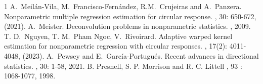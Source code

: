 \documentclass[11pt,a4paper,openany]{article}
\begin{document}
\begin{thebibliography}{1}
A.~Meil\'an-Vila, M.~Francisco-Fern\'andez, R.M.~Crujeiras and A.~Panzera.
\newblock Nonparametric multiple regression estimation for circular response.
, 30: 650-672, (2021).
A.~Meister.
\newblock Deconvolution problems in nonparametric statistics.
, 2009. 
T. D.~Nguyen, T. M.~Pham Ngoc, V.~Rivoirard.
\newblock Adaptive warped kernel estimation for nonparametric regression with circular responses.
, 17(2): 4011-4048, (2023).
A.~Pewsey and E.~Garc\'ia-Portugu\'es.
\newblock Recent advances in directional statistics.
, 30: 1-58, 2021.
B. Presnell, S. P. Morrison and R. C. Littell
, 93 : 1068-1077, 1998.
\end{thebibliography}
\end{document}
